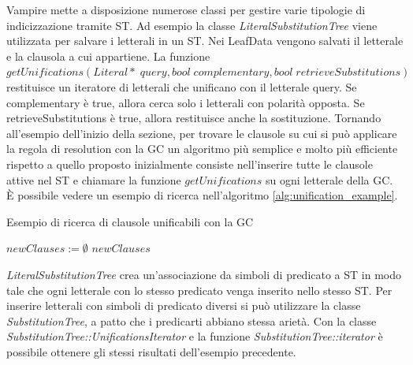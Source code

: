 \documentclass[./main.tex]{subfiles}
\begin{document}
Vampire mette a disposizione numerose classi per gestire varie tipologie di indicizzazione tramite ST.
Ad esempio la classe \textit{LiteralSubstitutionTree} viene utilizzata per salvare i letterali in un ST.
Nei LeafData vengono salvati il letterale e la clausola a cui appartiene.
La funzione $getUnifications(Literal*\; query, bool\; complementary, bool\; retrieveSubstitutions)$ 
restituisce un iteratore di 
letterali che unificano con il letterale query. Se complementary è true, allora cerca solo i letterali con polarità opposta.
Se retrieveSubstitutions è true, allora restituisce anche la sostituzione.
Tornando all'esempio dell'inizio della sezione, per trovare le clausole su cui si può applicare la regola di resolution
con la GC un algoritmo più semplice e molto più efficiente rispetto a quello proposto inizialmente
consiste nell'inserire tutte le clausole attive nel ST e
chiamare la funzione $getUnifications$ su ogni letterale della GC.
È possibile vedere un esempio di ricerca nell'algoritmo \ref{alg:unification_example}.

\begin{algorithm}
    \caption{Esempio di ricerca di clausole unificabili con la GC}
    \label{alg:unification_example}
    $newClauses := \emptyset$\;
    \Return $newClauses$\;
\end{algorithm}

\textit{LiteralSubstitutionTree} crea un'associazione da simboli di predicato a ST in modo tale che ogni letterale 
con lo stesso predicato venga inserito nello stesso ST. 
Per inserire letterali con simboli di predicato diversi si può utilizzare la classe \textit{SubstitutionTree}, a patto 
che i predicarti abbiano stessa arietà. Con la classe \textit{SubstitutionTree::UnificationsIterator} e 
la funzione \textit{SubstitutionTree::iterator} è possibile ottenere gli stessi risultati dell'esempio precedente.
\end{document}
